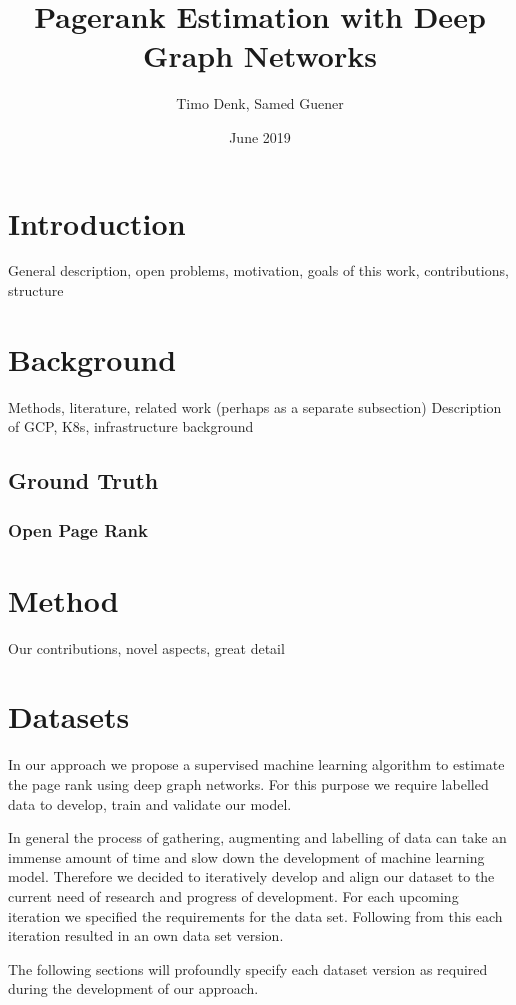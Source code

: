 \documentclass{article}
\title{Pagerank Estimation with Deep Graph Networks}
\author{Timo Denk, Samed Guener}
\date{June 2019}
\begin{document}
\maketitle

\section{Introduction}
General description, open problems, motivation, goals of this work, contributions, structure

\section{Background}
Methods, literature, related work (perhaps as a separate subsection)
Description of GCP, K8s, infrastructure background

\subsection{Ground Truth}
\subsubsection{Open Page Rank}
\label{OpenPageRank}

\section{Method}
Our contributions, novel aspects, great detail

\section{Datasets}
In our approach we propose a supervised machine learning algorithm to estimate the page rank using deep graph networks. For this purpose we require labelled data to develop, train and validate our model. 

In general the process of gathering, augmenting and labelling of data can take an immense amount of time and slow down the development of machine learning model. Therefore we decided to iteratively develop and align our dataset to the current need of research and progress of development. For each upcoming iteration we specified the requirements for the data set. Following from this each iteration resulted in an own data set version.

The following sections will profoundly specify each dataset version as required during the development of our approach.
\end{document}
